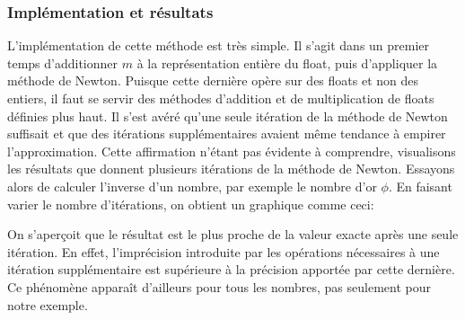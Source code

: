 \documentclass{article}
\begin{document}
\subsubsection{Implémentation et résultats}
L’implémentation de cette méthode est très simple. Il s'agit dans un premier temps d'additionner $m$ à la représentation entière du float, puis d'appliquer la méthode de Newton. Puisque cette dernière opère sur des floats et non des entiers, il faut se servir des méthodes d'addition et de multiplication de floats définies plus haut. Il s'est avéré qu'une seule itération de la méthode de Newton suffisait et que des itérations supplémentaires avaient même tendance à empirer l'approximation. Cette affirmation n'étant pas évidente à comprendre, visualisons les résultats que donnent plusieurs itérations de la méthode de Newton.
\newpage 
Essayons alors de calculer l'inverse d'un nombre, par exemple le nombre d'or $\phi$. En faisant varier le nombre d'itérations, on obtient un graphique comme ceci:
\begin{center}
\end{center}
On s'aperçoit que le résultat est le plus proche de la valeur exacte après une seule itération. En effet, l'imprécision introduite par les opérations nécessaires à une itération supplémentaire est supérieure à la précision apportée par cette dernière. Ce phénomène apparaît d'ailleurs pour tous les nombres, pas seulement pour notre exemple.
\end{document}
